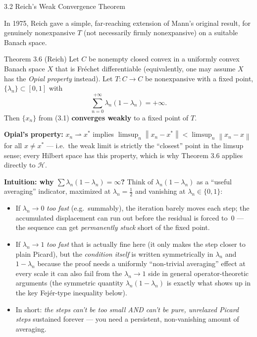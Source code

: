 \documentclass[aspectratio=169,10pt]{beamer}
\newcommand{\cH}{\mathcal{H}}
\newcommand{\norm}[1]{\left\|#1\right\|}
\newcommand{\weakto}{\rightharpoonup}
\begin{document}
\begin{frame}[allowframebreaks]{3.2 Reich's Weak Convergence Theorem}

  In 1975, Reich gave a simple, far-reaching extension of Mann's
  original result, for genuinely nonexpansive $T$ (not necessarily
  firmly nonexpansive) on a suitable Banach space.

  \begin{block}{Theorem 3.6 (Reich)}
    Let $C$ be nonempty closed convex in a uniformly convex Banach space
    $X$ that is Fr\'echet differentiable (equivalently, one may assume
    $X$ has the \emph{Opial property} instead). Let $T:C\to C$ be
    nonexpansive with a fixed point, $\{\lambda_n\}\subset[0,1]$ with
    $$\sum_{n=0}^{+\infty}\lambda_n(1-\lambda_n)=+\infty.$$
    Then $\{x_n\}$ from (3.1) \textbf{converges weakly} to a fixed
    point of $T$.
  \end{block}

  \textbf{Opial's property:} $x_n\weakto x^*$ implies
  $\limsup_n\norm{x_n-x^*}<\limsup_n\norm{x_n-x}$ for all $x\ne x^*$
  --- i.e.\ the weak limit is strictly the ``closest'' point in the
  limsup sense; every Hilbert space has this property, which is why
  Theorem 3.6 applies directly to $\cH$.

  \framebreak

  \textbf{Intuition: why $\sum\lambda_n(1-\lambda_n)=\infty$?} Think of
  $\lambda_n(1-\lambda_n)$ as a ``useful averaging'' indicator, maximized
  at $\lambda_n=\tfrac12$ and vanishing at $\lambda_n\in\{0,1\}$:
  \begin{itemize}
    \item If $\lambda_n\to0$ \emph{too fast} (e.g.\ summably), the
      iteration barely moves each step; the accumulated displacement
      can run out before the residual is forced to~0 --- the sequence
      can get \emph{permanently stuck} short of the fixed point.
    \item If $\lambda_n\to1$ \emph{too fast} that is actually fine here
      (it only makes the step closer to plain Picard), but the
      \emph{condition itself} is written symmetrically in $\lambda_n$
      and $1-\lambda_n$ because the proof needs a uniformly ``non-trivial
      averaging'' effect at every scale it can also fail from the
      $\lambda_n\to 1$ side in general operator-theoretic arguments (the
      symmetric quantity $\lambda_n(1-\lambda_n)$ is exactly what shows
      up in the key Fej\'er-type inequality below).
    \item In short: \emph{the steps can't be too small AND can't be
      pure, unrelaxed Picard steps} sustained forever --- you need a
      persistent, non-vanishing amount of averaging.
  \end{itemize}


\end{frame}
\end{document}
